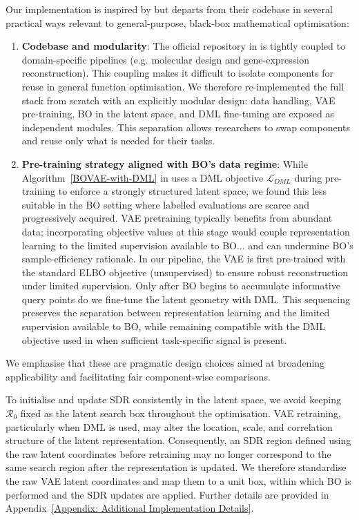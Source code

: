 \documentclass[pdflatex,sn-mathphys-num]{sn-jnl}%
\theoremstyle{thmstyleone}%
\theoremstyle{thmstyletwo}%
\theoremstyle{thmstylethree}%
\begin{document}
Our implementation is inspired by \cite{grosnit2021highdimensionalbayesianoptimisationvariational} but departs from their codebase in several practical ways relevant to general-purpose, black-box mathematical optimisation:

\begin{enumerate}
    \item \textbf{Codebase and modularity}: The official repository in \cite{grosnit2021highdimensionalbayesianoptimisationvariational} is tightly coupled to domain-specific pipelines (e.g. molecular design and gene-expression reconstruction). This coupling makes it difficult to isolate components for reuse in general function optimisation. We therefore re-implemented the full stack from scratch with an explicitly modular design: data handling, VAE pre-training, BO in the latent space, and DML fine-tuning are exposed as independent modules. This separation allows researchers to swap components and reuse only what is needed for their tasks.\\
    
    \item \textbf{Pre-training strategy aligned with BO’s data regime}: While Algorithm~\ref{BOVAE-with-DML} in \cite{grosnit2021highdimensionalbayesianoptimisationvariational} uses a DML objective $\mathcal{L}_{DML}$ during pre-training to enforce a strongly structured latent space, we found this less suitable in the BO setting where labelled evaluations are scarce and progressively acquired. VAE pretraining typically benefits from abundant data; incorporating objective values at this stage would couple representation learning to the limited supervision available to BO... and can undermine BO’s sample-efficiency rationale. In our pipeline, the VAE is first pre-trained with the standard ELBO objective (unsupervised) to ensure robust reconstruction under limited supervision. Only after BO begins to accumulate informative query points do we fine-tune the latent geometry with DML. This sequencing preserves the separation between representation learning and the limited supervision available to BO, while remaining compatible with the DML objective used in \cite{grosnit2021highdimensionalbayesianoptimisationvariational} when sufficient task-specific signal is present.
\end{enumerate}

We emphasise that these are pragmatic design choices aimed at broadening applicability and facilitating fair component-wise comparisons. 

To initialise and update SDR consistently in the latent space, we avoid keeping $\mathcal{R}_0$ fixed as the latent search box throughout the optimisation. VAE retraining, particularly when DML is used, may alter the location, scale, and correlation structure of the latent representation. Consequently, an SDR region defined using the raw latent coordinates before retraining may no longer correspond to the same search region after the representation is updated. We therefore standardise the raw VAE latent coordinates and map them to a unit box, within which BO is performed and the SDR updates are applied. Further details are provided in Appendix~\ref{Appendix: Additional Implementation Details}.
\end{document}
